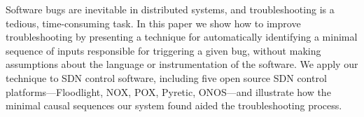 Software bugs are inevitable in distributed systems,
and troubleshooting
is a tedious, time-consuming task. In this paper we show how to improve
troubleshooting by presenting a technique
for automatically identifying
a minimal sequence of inputs responsible for triggering a given bug, without
making assumptions about the language or instrumentation of the
software.
We apply our technique to SDN control software, including five open source SDN control
platforms---Floodlight, NOX, POX, Pyretic, ONOS---and
illustrate how the minimal causal sequences our system found aided the
troubleshooting process.
